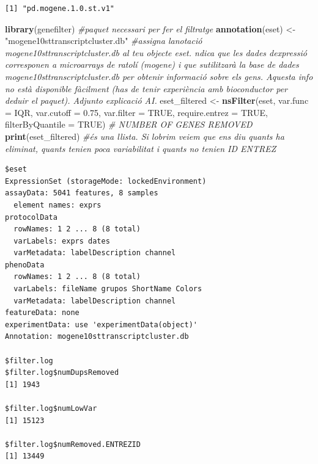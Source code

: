 \documentclass[
]{article}
\newenvironment{Shaded}{\begin{snugshade}}{\end{snugshade}}
\newcommand{\AttributeTok}[1]{\textcolor[rgb]{0.13,0.29,0.53}{#1}}
\newcommand{\CommentTok}[1]{\textcolor[rgb]{0.56,0.35,0.01}{\textit{#1}}}
\newcommand{\ConstantTok}[1]{\textcolor[rgb]{0.56,0.35,0.01}{#1}}
\newcommand{\FloatTok}[1]{\textcolor[rgb]{0.00,0.00,0.81}{#1}}
\newcommand{\FunctionTok}[1]{\textcolor[rgb]{0.13,0.29,0.53}{\textbf{#1}}}
\newcommand{\NormalTok}[1]{#1}
\newcommand{\OtherTok}[1]{\textcolor[rgb]{0.56,0.35,0.01}{#1}}
\newcommand{\StringTok}[1]{\textcolor[rgb]{0.31,0.60,0.02}{#1}}
\begin{document}
\begin{verbatim}
[1] "pd.mogene.1.0.st.v1"
\end{verbatim}

\begin{Shaded}
\begin{Highlighting}[]
\FunctionTok{library}\NormalTok{(genefilter)  }\CommentTok{\#paquet necessari per fer el filtratge}
\FunctionTok{annotation}\NormalTok{(eset) }\OtherTok{\textless{}{-}} \StringTok{"mogene10sttranscriptcluster.db"}  \CommentTok{\#assigna l\textquotesingle{}anotació \textquotesingle{}mogene10sttranscriptcluster.db\textquotesingle{} al teu objecte eset. ndica que les dades d\textquotesingle{}expressió corresponen a microarrays de ratolí (mogene) i que s\textquotesingle{}utilitzarà la base de dades \textquotesingle{}mogene10sttranscriptcluster.db\textquotesingle{} per obtenir informació sobre els gens. Aquesta info no està disponible fàcilment (has de tenir experiència amb bioconductor per deduir el paquet). Adjunto explicació AI.}
\NormalTok{eset\_filtered }\OtherTok{\textless{}{-}} \FunctionTok{nsFilter}\NormalTok{(eset, }\AttributeTok{var.func =}\NormalTok{ IQR, }\AttributeTok{var.cutoff =} \FloatTok{0.75}\NormalTok{, }\AttributeTok{var.filter =} \ConstantTok{TRUE}\NormalTok{,}
    \AttributeTok{require.entrez =} \ConstantTok{TRUE}\NormalTok{, }\AttributeTok{filterByQuantile =} \ConstantTok{TRUE}\NormalTok{)}
\CommentTok{\# NUMBER OF GENES REMOVED}
\FunctionTok{print}\NormalTok{(eset\_filtered)  }\CommentTok{\#és una llista. Si l\textquotesingle{}obrim veiem que ens diu quants ha eliminat, quants tenien poca variabilitat i quants no tenien ID ENTREZ}
\end{Highlighting}
\end{Shaded}

\begin{verbatim}
$eset
ExpressionSet (storageMode: lockedEnvironment)
assayData: 5041 features, 8 samples 
  element names: exprs 
protocolData
  rowNames: 1 2 ... 8 (8 total)
  varLabels: exprs dates
  varMetadata: labelDescription channel
phenoData
  rowNames: 1 2 ... 8 (8 total)
  varLabels: fileName grupos ShortName Colors
  varMetadata: labelDescription channel
featureData: none
experimentData: use 'experimentData(object)'
Annotation: mogene10sttranscriptcluster.db 

$filter.log
$filter.log$numDupsRemoved
[1] 1943

$filter.log$numLowVar
[1] 15123

$filter.log$numRemoved.ENTREZID
[1] 13449
\end{verbatim}
\end{document}
